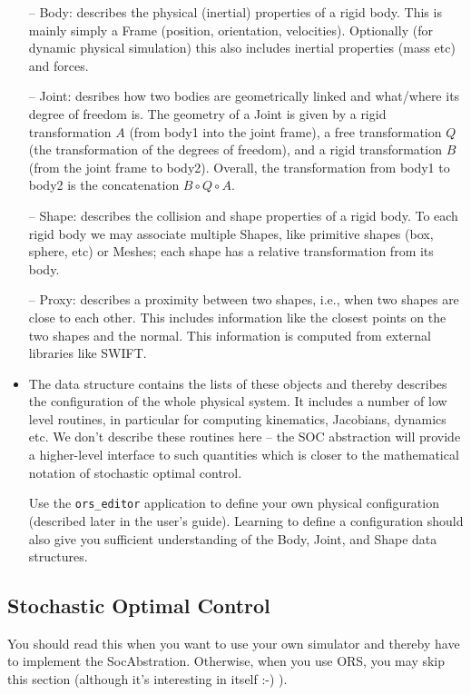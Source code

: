 \begin{itemize}
-- Body: describes the physical (inertial) properties of a rigid body.
   This is mainly simply a Frame (position, orientation,
   velocities). Optionally (for dynamic physical simulation) this also
   includes inertial properties (mass etc) and forces.

-- Joint: desribes how two bodies are geometrically linked and
   what/where its degree of freedom is. The geometry of a Joint is
   given by a rigid transformation $A$ (from body1 into the joint frame), a
   free transformation $Q$ (the transformation of the degrees of
   freedom), and a rigid transformation $B$ (from the joint frame to
   body2). Overall, the transformation from body1 to body2 is the
   concatenation $B \circ Q \circ A$.


-- Shape: describes the collision and shape properties of a rigid
   body. To each rigid body we may associate multiple Shapes, like
   primitive shapes (box, sphere, etc) or Meshes; each shape has a
   relative transformation from its body.

-- Proxy: describes a proximity between two shapes, i.e., when two
   shapes are close to each other. This includes information like the
   closest points on the two shapes and the normal. This information
   is computed from external libraries like SWIFT.

\item The  data structure contains the lists of these
   objects and thereby describes the configuration of the whole
   physical system. It includes a number of low level routines, in
   particular for computing kinematics, Jacobians, dynamics
   etc. We don't describe these routines here -- the SOC abstraction
   will provide a higher-level interface to such quantities which is
   closer to the mathematical notation of stochastic optimal control.

   Use the \lstinline$ors_editor$ application to define your own
   physical configuration (described later in the user's
   guide). Learning to define a configuration should also give you
   sufficient understanding of the Body, Joint, and Shape data
   structures.
\end{itemize}



\subsection{Stochastic Optimal Control}\label{secSOC}

You should read this when you want to use your own simulator and
thereby have to implement the SocAbstration. Otherwise, when you use
ORS, you may skip this section (although it's interesting in
itself :-) ).

